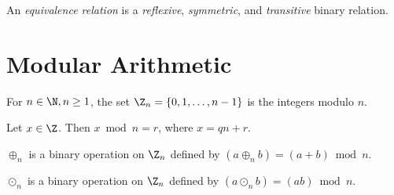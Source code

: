 \documentclass[12pt]{article}
\begin{document}
\begin{defn}
    An \emph{equivalence relation} is a \emph{reflexive}, \emph{symmetric}, and \emph{transitive} binary relation.
\end{defn}

\section{Modular Arithmetic}

\begin{defn}
    For $n \in \N, n \geq 1$, the set $\Z_n = \{0, 1, \ldots, n-1\}$ is the integers modulo $n$.
\end{defn}

\begin{defn}
    Let $x \in \Z$. Then $x \bmod n = r$, where $x = qn + r$.
\end{defn}

\begin{defn}
    $\oplus_n$ is a binary operation on $\Z_n$ defined by $(a \oplus_n b) = (a + b)\bmod n$.
\end{defn}

\begin{defn}
    $\odot_n$ is a binary operation on $\Z_n$ defined by $(a \odot_n b) = (ab)\bmod n$.
\end{defn}
\end{document}
